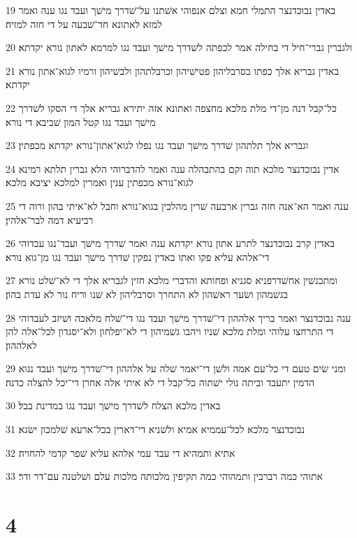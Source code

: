 \par 19 באדין נבוכדנצר התמלי חמא וצלם אנפוהי אשׁתנו על־שׁדרך מישׁך ועבד נגו ענה ואמר למזא לאתונא חד־שׁבעה על די חזה למזיה׃
\par 20 ולגברין גברי־חיל די בחילה אמר לכפתה לשׁדרך מישׁך ועבד נגו למרמא לאתון נורא יקדתא׃
\par 21 באדין גבריא אלך כפתו בסרבליהון פטישׁיהון וכרבלתהון ולבשׁיהון ורמיו לגוא־אתון נורא יקדתא׃
\par 22 כל־קבל דנה מן־די מלת מלכא מחצפה ואתונא אזה יתירא גבריא אלך די הסקו לשׁדרך מישׁך ועבד נגו קטל המון שׁביבא די נורא׃
\par 23 וגבריא אלך תלתהון שׁדרך מישׁך ועבד נגו נפלו לגוא־אתון־נורא יקדתא מכפתין׃
\par 24 אדין נבוכדנצר מלכא תוה וקם בהתבהלה ענה ואמר להדברוהי הלא גברין תלתא רמינא לגוא־נורא מכפתין ענין ואמרין למלכא יציבא מלכא׃
\par 25 ענה ואמר הא־אנה חזה גברין ארבעה שׁרין מהלכין בגוא־נורא וחבל לא־איתי בהון ורוה די רביעיא דמה לבר־אלהין׃
\par 26 באדין קרב נבוכדנצר לתרע אתון נורא יקדתא ענה ואמר שׁדרך מישׁך ועבד־נגו עבדוהי די־אלהא עליא פקו ואתו באדין נפקין שׁדרך מישׁך ועבד נגו מן־גוא נורא׃
\par 27 ומתכנשׁין אחשׁדרפניא סגניא ופחותא והדברי מלכא חזין לגבריא אלך די לא־שׁלט נורא בגשׁמהון ושׂער ראשׁהון לא התחרך וסרבליהון לא שׁנו וריח נור לא עדת בהון׃
\par 28 ענה נבוכדנצר ואמר בריך אלההון די־שׁדרך מישׁך ועבד נגו די־שׁלח מלאכה ושׁיזב לעבדוהי די התרחצו עלוהי ומלת מלכא שׁניו ויהבו גשׁמיהון די לא־יפלחון ולא־יסגדון לכל־אלה להן לאלההון׃
\par 29 ומני שׂים טעם די כל־עם אמה ולשׁן די־יאמר שׁלה על אלההון די־שׁדרך מישׁך ועבד נגוא הדמין יתעבד וביתה נולי ישׁתוה כל־קבל די לא איתי אלה אחרן די־יכל להצלה כדנה׃
\par 30 באדין מלכא הצלח לשׁדרך מישׁך ועבד נגו במדינת בבל׃
\par 31 נבוכדנצר מלכא לכל־עממיא אמיא ולשׁניא די־דארין בכל־ארעא שׁלמכון ישׂגא׃
\par 32 אתיא ותמהיא די עבד עמי אלהא עליא שׁפר קדמי להחויה׃
\par 33 אתוהי כמה רברבין ותמהוהי כמה תקיפין מלכותה מלכות עלם ושׁלטנה עם־דר ודר׃

\chapter{4}

